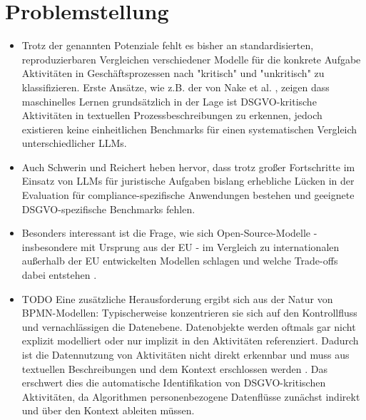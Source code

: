 \section{Problemstellung}\label{sec:problemstellung}

\begin{itemize}
    \item Trotz der genannten Potenziale fehlt es bisher an standardisierten, reproduzierbaren Vergleichen verschiedener Modelle für die konkrete Aufgabe Aktivitäten in Geschäftsprozessen nach "kritisch" und "unkritisch" zu klassifizieren. Erste Ansätze, wie z.B. der von Nake et al. \cite{nake2023towards}, zeigen dass maschinelles Lernen grundsätzlich in der Lage ist \ac{DSGVO}-kritische Aktivitäten in textuellen Prozessbeschreibungen zu erkennen, jedoch existieren keine einheitlichen Benchmarks für einen systematischen Vergleich unterschiedlicher LLMs.
    \item Auch Schwerin und Reichert \cite{schwerin2024systematic} heben hervor, dass trotz großer Fortschritte im Einsatz von \acp{LLM} für juristische Aufgaben bislang erhebliche Lücken in der Evaluation für compliance-spezifische Anwendungen bestehen und geeignete \ac{DSGVO}-spezifische Benchmarks fehlen.
    \item Besonders interessant ist die Frage, wie sich Open-Source-Modelle - insbesondere mit Ursprung aus der \ac{EU} - im Vergleich zu internationalen außerhalb der \ac{EU} entwickelten Modellen schlagen und welche Trade-offs dabei entstehen \cite{schwerin2024systematic}.
    \item TODO Eine zusätzliche Herausforderung ergibt sich aus der Natur von \ac{BPMN}-Modellen: Typischerweise konzentrieren sie sich auf den Kontrollfluss und vernachlässigen die Datenebene. Datenobjekte werden oftmals gar nicht explizit modelliert oder nur implizit in den Aktivitäten referenziert. Dadurch ist die Datennutzung von Aktivitäten nicht direkt erkennbar und muss aus textuellen Beschreibungen und dem Kontext erschlossen werden \cite{schneid2021uncovering}. Das erschwert dies die automatische Identifikation von \ac{DSGVO}-kritischen Aktivitäten, da Algorithmen personenbezogene Datenflüsse zunächst indirekt und über den Kontext ableiten müssen.
\end{itemize}
